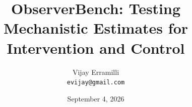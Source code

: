 \documentclass[10pt]{article}
\title{ObserverBench: Testing Mechanistic Estimates for Intervention and Control}
\author{Vijay Erramilli\\\texttt{evijay@gmail.com}}
\date{September 4, 2026}
\begin{document}
\maketitle

\begin{abstract}

\end{abstract}









\clearpage


\clearpage
\appendix









\end{document}
